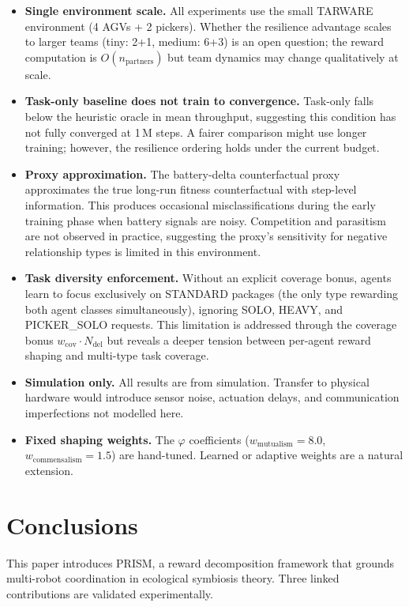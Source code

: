 \documentclass[Afour,sageh,times]{sagej}
\begin{document}
\begin{itemize}
    \item \textbf{Single environment scale.} All experiments use the small TARWARE environment (4 AGVs + 2 pickers). Whether the resilience advantage scales to larger teams (tiny: 2+1, medium: 6+3) is an open question; the reward computation is $O(n_{\mathrm{partners}})$ but team dynamics may change qualitatively at scale.
    \item \textbf{Task-only baseline does not train to convergence.} Task-only falls below the heuristic oracle in mean throughput, suggesting this condition has not fully converged at 1\,M steps. A fairer comparison might use longer training; however, the resilience ordering holds under the current budget.
    \item \textbf{Proxy approximation.} The battery-delta counterfactual proxy approximates the true long-run fitness counterfactual with step-level information. This produces occasional misclassifications during the early training phase when battery signals are noisy. Competition and parasitism are not observed in practice, suggesting the proxy's sensitivity for negative relationship types is limited in this environment.
    \item \textbf{Task diversity enforcement.} Without an explicit coverage bonus, agents learn to focus exclusively on STANDARD packages (the only type rewarding both agent classes simultaneously), ignoring SOLO, HEAVY, and PICKER\_SOLO requests. This limitation is addressed through the coverage bonus $w_{\mathrm{cov}} \cdot N_{\mathrm{del}}$ but reveals a deeper tension between per-agent reward shaping and multi-type task coverage.
    \item \textbf{Simulation only.} All results are from simulation. Transfer to physical hardware would introduce sensor noise, actuation delays, and communication imperfections not modelled here.
    \item \textbf{Fixed shaping weights.} The $\varphi$ coefficients ($w_{\mathrm{mutualism}} = 8.0$, $w_{\mathrm{commensalism}} = 1.5$) are hand-tuned. Learned or adaptive weights are a natural extension.
\end{itemize}


\section{Conclusions}
\label{sec:conclusion}

This paper introduces PRISM, a reward decomposition framework that grounds multi-robot coordination in ecological symbiosis theory. Three linked contributions are validated experimentally.
\end{document}
